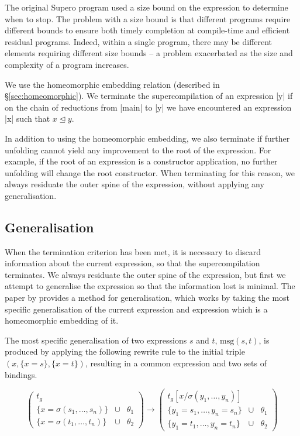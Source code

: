 The original Supero program used a size bound on the expression to determine when to stop. The problem with a size bound is that different programs require different bounds to ensure both timely completion at compile-time and efficient residual programs. Indeed, within a single program, there may be different elements requiring different size bounds -- a problem exacerbated as the size and complexity of a program increases.

We use the homeomorphic embedding relation (described in \S\ref{sec:homeomorphic}). We terminate the supercompilation of an expression |y| if on the chain of reductions from |main| to |y| we have encountered an expression |x| such that $x \unlhd y$.

In addition to using the homeomorphic embedding, we also terminate if further unfolding cannot yield any improvement to the root of the expression. For example, if the root of an expression is a constructor application, no further unfolding will change the root constructor. When terminating for this reason, we always residuate the outer spine of the expression, without applying any generalisation.

\subsection{Generalisation}

When the termination criterion has been met, it is necessary to discard information about the current expression, so that the supercompilation terminates. We always residuate the outer spine of the expression, but first we attempt to generalise the expression so that the information lost is minimal. The paper by \citet{sorensen:supercompilation} provides a method for generalisation, which works by taking the most specific generalisation of the current expression and expression which is a homeomorphic embedding of it.

The most specific generalisation of two expressions $s$ and $t$, $\text{msg}(s,t)$, is produced by applying the following rewrite rule to the initial triple $(x,\{x=s\},\{x=t\})$, resulting in a common expression and two sets of bindings.

\[
\left( \begin{array}{lcl}
	t_g \\
	\{x = \sigma(s_1,\ldots,s_n)\} & \cup & \theta_1 \\
	\{x = \sigma(t_1,\ldots,t_n)\} & \cup & \theta_2
	\end{array} \right)
\rightarrow
\left( \begin{array}{lcl}
	t_g[x / \sigma(y_1,\ldots,y_n)] \\
	\{y_1 = s_1,\ldots,y_n = s_n\} & \cup & \theta_1 \\
	\{y_1 = t_1,\ldots,y_n = t_n\} & \cup & \theta_2
	\end{array} \right)
\]

